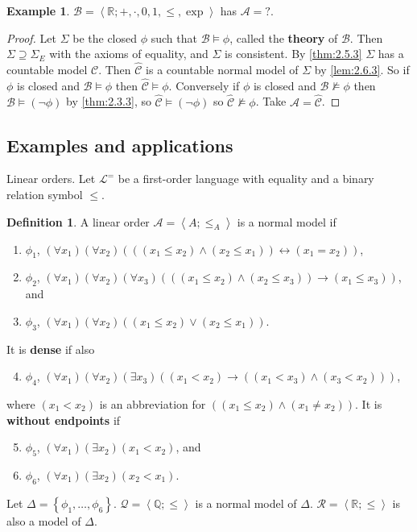 \documentclass{article}
\newcommand{\Q}{\mathbb{Q}}
\newcommand{\R}{\mathbb{R}}
\newcommand{\rb}[1]{\left( #1 \right)}
\newcommand{\cb}[1]{\left\{ #1 \right\}}
\newcommand{\ab}[1]{\left\langle #1 \right\rangle}
\newcommand{\notb}[1]{\rb{\neg #1}}
\newcommand{\orb}[2]{\rb{#1 \lor #2}}
\newcommand{\andb}[2]{\rb{#1 \land #2}}
\newcommand{\impb}[2]{\rb{#1 \rightarrow #2}}
\newcommand{\iffb}[2]{\rb{#1 \leftrightarrow #2}}
\newcommand{\fab}[1]{\rb{\forall #1}}
\newcommand{\teb}[1]{\rb{\exists #1}}
\theoremstyle{definition}\newtheorem{definition}{Definition}[subsection]
\theoremstyle{definition}\newtheorem{remark}[definition]{Remark}
\theoremstyle{definition}\newtheorem*{example}{Example}
\theoremstyle{definition}\newtheorem*{note}{Note}
\begin{document}
\begin{example}
$ \mathcal{B} = \ab{\R; +, \cdot, 0, 1, \le, \exp} $ has $ \mathcal{A} = ? $.
\end{example}

\begin{proof}
Let $ \Sigma $ be the closed $ \phi $ such that $ \mathcal{B} \vDash \phi $, called the \textbf{theory} of $ \mathcal{B} $. Then $ \Sigma \supseteq \Sigma_E $ with the axioms of equality, and $ \Sigma $ is consistent. By \ref{thm:2.5.3} $ \Sigma $ has a countable model $ \mathcal{C} $. Then $ \widehat{\mathcal{C}} $ is a countable normal model of $ \Sigma $ by \ref{lem:2.6.3}. So if $ \phi $ is closed and $ \mathcal{B} \vDash \phi $ then $ \widehat{\mathcal{C}} \vDash \phi $. Conversely if $ \phi $ is closed and $ \mathcal{B} \not\vDash \phi $ then $ \mathcal{B} \vDash \notb{\phi} $ by \ref{thm:2.3.3}, so $ \widehat{\mathcal{C}} \vDash \notb{\phi} $ so $ \widehat{\mathcal{C}} \not\vDash \phi $. Take $ \mathcal{A} = \widehat{\mathcal{C}} $.
\end{proof}

\subsection{Examples and applications}

Linear orders. Let $ \mathcal{L}^= $ be a first-order language with equality and a binary relation symbol $ \le $.

\begin{definition}
A linear order $ \mathcal{A} = \ab{A; \le_A} $ is a normal model if
\begin{enumerate}
\item $ \phi_1 $, $ \fab{x_1}\fab{x_2}\iffb{\andb{\rb{x_1 \le x_2}}{\rb{x_2 \le x_1}}}{\rb{x_1 = x_2}} $,
\item $ \phi_2 $, $ \fab{x_1}\fab{x_2}\fab{x_3}\impb{\andb{\rb{x_1 \le x_2}}{\rb{x_2 \le x_3}}}{\rb{x_1 \le x_3}} $, and
\item $ \phi_3 $, $ \fab{x_1}\fab{x_2}\orb{\rb{x_1 \le x_2}}{\rb{x_2 \le x_1}} $.
\end{enumerate}
It is \textbf{dense} if also
\begin{enumerate}
\setcounter{enumi}{3}
\item $ \phi_4 $, $ \fab{x_1}\fab{x_2}\teb{x_3}\impb{\rb{x_1 < x_2}}{\andb{\rb{x_1 < x_3}}{\rb{x_3 < x_2}}} $,
\end{enumerate}
where $ \rb{x_1 < x_2} $ is an abbreviation for $ \andb{\rb{x_1 \le x_2}}{\rb{x_1 \ne x_2}} $. It is \textbf{without endpoints} if
\begin{enumerate}
\setcounter{enumi}{4}
\item $ \phi_5 $, $ \fab{x_1}\teb{x_2}\rb{x_1 < x_2} $, and
\item $ \phi_6 $, $ \fab{x_1}\teb{x_2}\rb{x_2 < x_1} $.
\end{enumerate}
Let $ \Delta = \cb{\phi_1, \dots, \phi_6} $. $ \mathcal{Q} = \ab{\Q; \le} $ is a normal model of $ \Delta $. $ \mathcal{R} = \ab{\R; \le} $ is also a model of $ \Delta $.
\end{definition}
\end{document}

